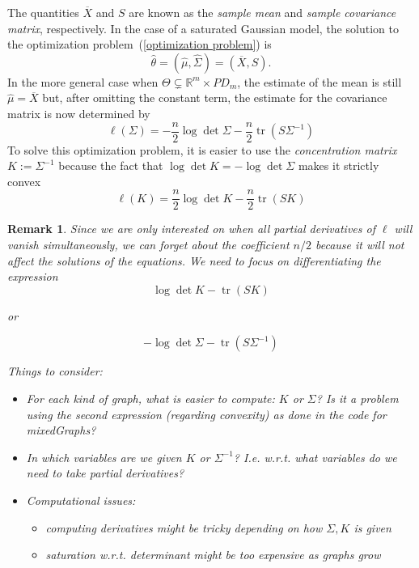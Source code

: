 \documentclass[10pt,a4paper]{article}
\newtheorem{remark}{Remark}
\begin{document}
The quantities $\overline{X}$ and $S$ are known as the \emph{sample mean} and \emph{sample covariance matrix}, respectively.
In the case of a saturated Gaussian model, the solution to the optimization problem~(\ref{optimization problem}) is
\[\hat{\theta}=(\hat{\mu},\hat{\Sigma})=(\overline{X},S).\]
In the more general case when $\Theta\subsetneq\mathbb{R}^m \times PD_m$, the estimate of the mean is still $\hat{\mu}=\overline{X}$  but, after omitting the constant term, the estimate for the covariance matrix is now determined by
\begin{equation*}
\ell(\Sigma)=-\frac{n}{2}\log \det \Sigma - \frac{n}{2}\operatorname{tr}\left(S\Sigma^{-1}\right)
\end{equation*}
To solve this optimization problem, it is easier to use the \emph{concentration matrix} $K:=\Sigma^{-1}$ because the fact that $\log \det K=-\log \det \Sigma$ makes it strictly convex
\begin{equation}\label{ell}
\ell(K)=\frac{n}{2}\log \det K - \frac{n}{2}\operatorname{tr}\left(SK\right)
\end{equation}

\begin{remark} Since we are only interested on when all  partial derivatives of $\ell$ will vanish simultaneously, we can forget about the coefficient $n/2$ because it will not affect the solutions of the equations. We need to focus on differentiating the expression $$\log \det K - \operatorname{tr}\left(SK\right)$$

or 

$$-\log \det \Sigma - \operatorname{tr}\left(S\Sigma^{-1}\right)$$

Things to consider:
\begin{itemize}
\item For each kind of graph, what is easier to compute: $K$ or $\Sigma$? Is it a problem using the second expression (regarding convexity) as done in the code for mixedGraphs?
\item In which variables are we given $K$ or $\Sigma^{-1}$? I.e. w.r.t. what variables do we need to take partial derivatives?
\item Computational issues:
\begin{itemize}
\item computing derivatives might be tricky depending on how $\Sigma,K$ is given
\item saturation w.r.t. determinant might be too expensive as graphs grow
\end{itemize}
\end{itemize}
\end{remark}
\end{document}
